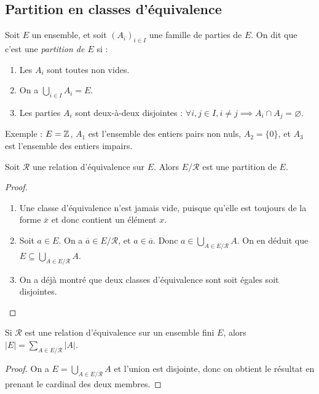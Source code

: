 \subsection{Partition en classes d'équivalence}

\begin{definition}
Soit $E$ un ensemble, et soit $(A_i)_{i\in I}$ une famille de parties de $E$. On dit que c'est une \emph{partition de $E$} si :
\begin{enumerate}
\item Les $A_i$ sont toutes non vides.
\item On a $\bigcup_{i\in I} A_i = E$.
\item Les parties $A_i$ sont deux-à-deux disjointes : $\forall i, j\in I, i\neq j \implies A_i\cap A_j=\varnothing$.
\end{enumerate}
\end{definition}

Exemple : $E = \mathbb{Z}$, $A_1 $ est l'ensemble des entiers pairs non nuls, $A_2=\{0\}$, et $A_3$ est l'ensemble des entiers impairs.

\begin{proposition}
Soit $\mathcal R$ une relation d'équivalence sur $E$. Alors $E/\mathcal R$ est une partition de $E$.
\end{proposition}
\begin{proof}
\begin{enumerate}
\item Une classe d'équivalence n'est jamais vide, puisque qu'elle est toujours de la forme $\overline{x}$ et donc contient un élément $x$.
\item Soit $a\in E$. On a $\overline{a} \in E/\mathcal R$, et $a\in \overline{a}$. Donc $a\in \bigcup_{A\in E/\mathcal R} A$. On en déduit que $E\subseteq \bigcup_{A\in E/\mathcal R} A$.
\item On a déjà montré que deux classes d'équivalence sont soit égales soit disjointes.
\end{enumerate}
\end{proof}

\begin{corollaire}
Si $\mathcal R$ est une relation d'équivalence sur un ensemble fini $E$, alors $|E| = \sum_{A\in E/\mathcal R} |A|$.
\end{corollaire}
\begin{proof}
On a  $E= \bigcup_{A\in E/\mathcal R} A$ et l'union est disjointe, donc on obtient le résultat en prenant le cardinal des deux membres.
\end{proof}